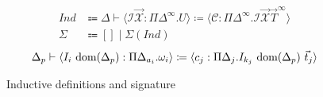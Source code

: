 \begin{figure}
\centering
\begin{align*}
\textit{Ind} &\Coloneqq \Delta \vdash \langle \mathcal{I} \vec{\mathcal{X}}: \Pi\Delta^\infty. U \rangle \coloneqq \langle \mathcal{C}: \Pi\Delta^\infty. \mathcal{I} \vec{\mathcal{X}} \vec{T}^\infty \rangle \\
\Sigma &\Coloneqq [] \mid \Sigma (\textit{Ind})
\end{align*}
\begin{equation*}
\Delta_p \vdash \langle I_i\ \text{dom}(\Delta_p): \Pi\Delta_{a_i}. \omega_i \rangle \coloneqq \langle c_j: \Pi\Delta_j. I_{k_j}\ \text{dom}(\Delta_p)\ \vec{t}_j \rangle
\end{equation*}
\caption{Inductive definitions and signature}
\label{fig:inductives}
\end{figure}